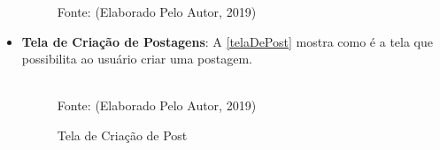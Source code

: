 \begin{itemize}
\begin{figure}[!htpb]
		Fonte: (Elaborado Pelo Autor, 2019)
		\label{telaInicial}
	\end{figure}

\newpage
	\item \textbf{Tela de Criação de Postagens}: A \autoref{telaDePost} mostra como é a tela que possibilita ao usuário criar uma postagem.
	\begin{figure}[!htpb]
		\centering
		\caption{Tela de Criação de Post}
		\\
		Fonte: (Elaborado Pelo Autor, 2019)
		\label{telaDePost}
	\end{figure}
	

\end{itemize}
